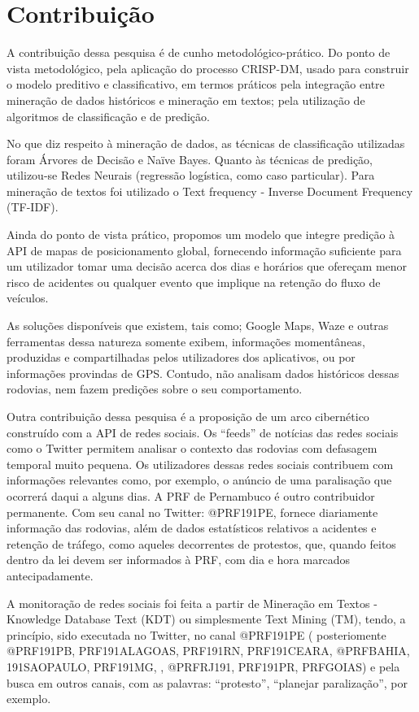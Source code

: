 \chapter{Contribuição}\label{meto}

A contribuição dessa pesquisa é de cunho metodológico-prático.
Do ponto de vista metodológico, pela aplicação do processo CRISP-DM, usado para construir o modelo preditivo e classificativo, em termos práticos pela integração entre mineração de dados históricos e mineração em textos; pela utilização de algoritmos de classificação e de predição. 

No que diz respeito à mineração de dados, as técnicas de classificação utilizadas foram Árvores de Decisão e Naïve Bayes. Quanto às técnicas de predição, utilizou-se Redes Neurais (regressão logística, como caso particular). Para mineração de textos foi utilizado o Text frequency - Inverse Document Frequency (TF-IDF).

Ainda do ponto de vista prático, propomos um modelo que integre predição à API de mapas de posicionamento global, fornecendo informação suficiente para um utilizador tomar uma decisão acerca dos dias e horários que ofereçam menor risco de acidentes ou qualquer evento que implique na retenção do fluxo de veículos. 

As soluções disponíveis que existem, tais como; Google Maps, Waze e outras ferramentas dessa natureza somente exibem, informações momentâneas, produzidas e compartilhadas pelos utilizadores dos aplicativos, ou por informações provindas de GPS. Contudo, não analisam dados históricos dessas rodovias, nem fazem predições sobre o seu comportamento.

Outra contribuição dessa pesquisa é a proposição de um arco cibernético construído com a API de redes sociais.
Os ``feeds'' de notícias das redes sociais como o Twitter permitem analisar o contexto das rodovias com defasagem temporal muito pequena.
Os utilizadores dessas redes sociais contribuem com informações relevantes como, por exemplo, o anúncio de uma paralisação que ocorrerá 
daqui a alguns dias. A PRF de Pernambuco é outro contribuidor permanente. Com seu canal no Twitter: @PRF191PE, fornece diariamente informação das rodovias, 
além de dados estatísticos relativos a acidentes e retenção de tráfego, como aqueles decorrentes de protestos, que, quando feitos dentro da lei
devem ser informados à PRF, com dia e hora marcados antecipadamente.

A monitoração de redes sociais foi feita a partir de Mineração em Textos - Knowledge Database Text (KDT) ou simplesmente Text Mining (TM), tendo, a princípio, sido executada no Twitter, no canal @PRF191PE ( posteriomente @PRF191PB, PRF191ALAGOAS, PRF191RN, PRF191CEARA, @PRFBAHIA, 191SAOPAULO, PRF191MG, , @PRFRJ191, PRF191PR, PRFGOIAS) e pela busca em outros canais, com as palavras: ``protesto'', ``planejar paralização'', por exemplo. 

